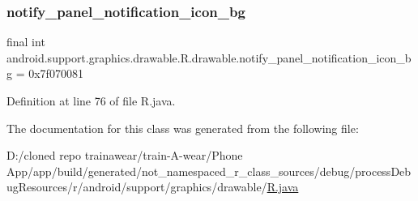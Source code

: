 \subsubsection{\texorpdfstring{notify\_panel\_notification\_icon\_bg}{notify\_panel\_notification\_icon\_bg}}
{\footnotesize\ttfamily final int android.\+support.\+graphics.\+drawable.\+R.\+drawable.\+notify\+\_\+panel\+\_\+notification\+\_\+icon\+\_\+bg = 0x7f070081\hspace{0.3cm}{\ttfamily [static]}}



Definition at line 76 of file R.\+java.



The documentation for this class was generated from the following file\+:\begin{DoxyCompactItemize}
\item 
D\+:/cloned repo trainawear/train-\/\+A-\/wear/\+Phone App/app/build/generated/not\+\_\+namespaced\+\_\+r\+\_\+class\+\_\+sources/debug/process\+Debug\+Resources/r/android/support/graphics/drawable/\mbox{\hyperlink{process_debug_resources_2r_2android_2support_2graphics_2drawable_2_r_8java}{R.\+java}}\end{DoxyCompactItemize}
